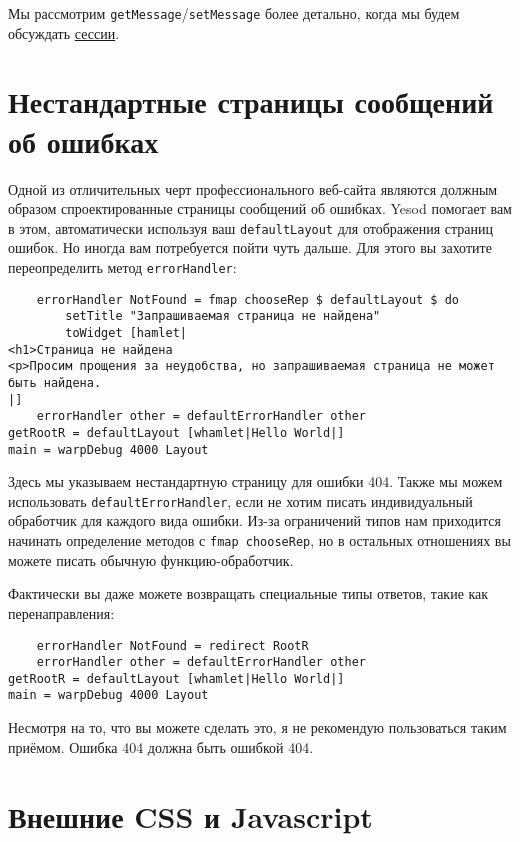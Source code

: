 Мы рассмотрим \lstinline!getMessage!/\lstinline!setMessage! более детально, когда мы будем обсуждать \hyperref[ch:sessions]{сессии}.

\section {Нестандартные страницы сообщений об ошибках}

Одной из отличительных черт профессионального веб-сайта являются должным образом спроектированные страницы сообщений об ошибках. Yesod помогает вам в этом, автоматически используя ваш \lstinline!defaultLayout! для отображения страниц ошибок. Но иногда вам потребуется пойти чуть дальше. Для этого вы захотите переопределить метод \lstinline!errorHandler!:

\begin{lstlisting}
    errorHandler NotFound = fmap chooseRep $ defaultLayout $ do
        setTitle "Запрашиваемая страница не найдена"
        toWidget [hamlet|
<h1>Страница не найдена
<p>Просим прощения за неудобства, но запрашиваемая страница не может быть найдена.
|]
    errorHandler other = defaultErrorHandler other
getRootR = defaultLayout [whamlet|Hello World|]
main = warpDebug 4000 Layout
\end{lstlisting}

Здесь мы указываем нестандартную страницу для ошибки 404. Также мы можем использовать \lstinline!defaultErrorHandler!, если не хотим писать индивидуальный обработчик для каждого вида ошибки. Из-за ограничений типов нам приходится начинать определение методов с \lstinline!fmap chooseRep!, но в остальных отношениях вы можете писать обычную функцию-обработчик.

Фактически вы даже можете возвращать специальные типы ответов, такие как перенаправления:

\begin{lstlisting}
    errorHandler NotFound = redirect RootR
    errorHandler other = defaultErrorHandler other
getRootR = defaultLayout [whamlet|Hello World|]
main = warpDebug 4000 Layout
\end{lstlisting}

\begin{remark}
Несмотря на то, что вы можете сделать это, я не рекомендую пользоваться таким приёмом. Ошибка 404 должна быть ошибкой 404.
\end{remark}

\section {Внешние CSS и Javascript}

